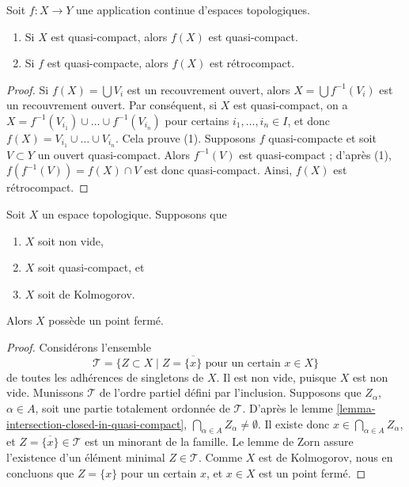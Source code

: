 \begin{lemma}
\label{lemma-image-quasi-compact}
Soit $f : X \to Y$ une application continue d'espaces topologiques.
\begin{enumerate}
\item Si $X$ est quasi-compact, alors $f(X)$ est quasi-compact.
\item Si $f$ est quasi-compacte, alors $f(X)$ est rétrocompact.
\end{enumerate}
\end{lemma}

\begin{proof}
Si $f(X) = \bigcup V_i$ est un recouvrement ouvert, alors
$X = \bigcup f^{-1}(V_i)$ est un recouvrement ouvert. Par conséquent, si $X$
est quasi-compact, on a
$X = f^{-1}(V_{i_1}) \cup \ldots \cup f^{-1}(V_{i_n})$ pour certains
$i_1, \ldots, i_n \in I$, et donc
$f(X) = V_{i_1} \cup \ldots \cup V_{i_n}$. Cela prouve (1).
Supposons $f$ quasi-compacte et soit $V \subset Y$ un ouvert quasi-compact.
Alors $f^{-1}(V)$ est quasi-compact ; d'après (1),
$f(f^{-1}(V)) = f(X) \cap V$ est donc quasi-compact. Ainsi, $f(X)$ est
rétrocompact.
\end{proof}

\begin{lemma}
\label{lemma-quasi-compact-closed-point}
Soit $X$ un espace topologique. Supposons que
\begin{enumerate}
\item $X$ soit non vide,
\item $X$ soit quasi-compact, et
\item $X$ soit de Kolmogorov.
\end{enumerate}
Alors $X$ possède un point fermé.
\end{lemma}

\begin{proof}
Considérons l'ensemble
$$
\mathcal{T} =
\{Z \subset X \mid Z = \overline{\{x\}} \text{ pour un certain }x \in X\}
$$
de toutes les adhérences de singletons de $X$. Il est non vide, puisque $X$
est non vide. Munissons $\mathcal{T}$ de l'ordre partiel défini par
l'inclusion. Supposons que $Z_\alpha$, $\alpha \in A$, soit une partie
totalement ordonnée de $\mathcal{T}$.
D'après le lemme \ref{lemma-intersection-closed-in-quasi-compact},
$\bigcap_{\alpha \in A} Z_\alpha \not = \emptyset$. Il existe donc
$x \in \bigcap_{\alpha \in A} Z_\alpha$, et
$Z = \overline{\{x\}}\in \mathcal{T}$ est un minorant de la famille.
Le lemme de Zorn assure l'existence d'un élément minimal
$Z \in \mathcal{T}$. Comme $X$ est de Kolmogorov, nous en concluons que
$Z = \{x\}$ pour un certain $x$, et $x \in X$ est un point fermé.
\end{proof}


